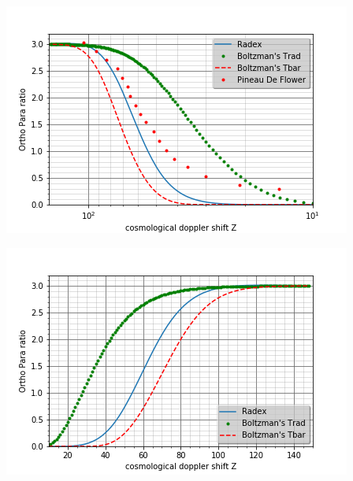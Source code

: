 \documentclass[12pt, a4paper]{article}
\begin{document}
\includegraphics{rop}

\includegraphics{rop2}
\end{document}
